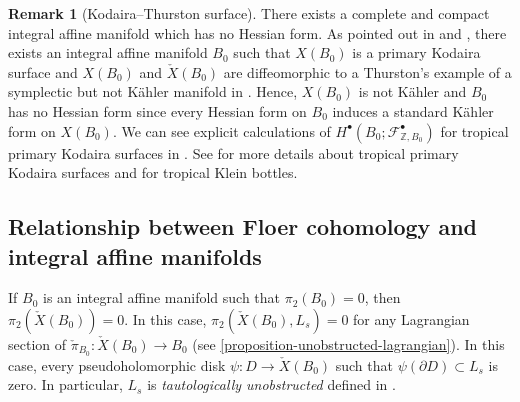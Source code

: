 \documentclass[a4paper,dvipdfmx,reqno,12pt]{amsart}
\theoremstyle{definition}
\newtheorem{remark}[theorem]{Remark}
\numberwithin{equation}{section}
\begin{document}
\begin{remark}[{Kodaira--Thurston surface}]
There exists a complete and compact integral affine manifold
  which has no Hessian form.
As pointed out in \cite[Example 1.14]{grossMirrorSymmetryLogarithmic2006a}
and \cite[p.403]{MR1461965}, there exists an integral affine manifold
$B_0$ such that
$X(B_0)$ is a primary Kodaira surface and $X(B_0)$
and $\check{X}(B_0)$
are diffeomorphic to a Thurston's example of a symplectic but
not K\"ahler manifold in \cite{MR402764}.
Hence, $X(B_0)$ is not K\"ahler and $B_0$ has no
Hessian form since every Hessian form on $B_0$ induces a 
standard K\"ahler form
on $X(B_0)$.
We can see explicit calculations of 
$H^{\bullet}(B_0;\mathcal{F}_{\mathbb{Z},B_0}^{\bullet})$
for tropical primary Kodaira surfaces in \cite{maehara2023}.
See \cite{MR1422337} for more details about tropical 
primary Kodaira surfaces and 
\cite{MR3079343,MR3894860} for tropical Klein bottles.

\end{remark}

\subsection{Relationship between Floer cohomology
and integral affine manifolds}


If $B_0$ is an integral affine manifold such 
that $\pi_2(B_0)=0$, then $\pi_2(\check{X}(B_0))=0$.
In this case, $\pi_2(\check{X}(B_0),L_s)=0$ for 
any Lagrangian section of 
$\check{\pi}_{B_0}\colon \check{X}(B_0)\to B_0$
(see \cref{proposition-unobstructed-lagrangian}).
In this case, every 
pseudoholomorphic disk 
$\psi\colon D\to \check{X}(B_0)$ such that 
$\psi(\partial D)\subset L_s$ is zero.
In particular, $L_s$ is 
\emph{tautologically unobstructed} defined in
\cite[(2.50)]{MR3656481}.
\end{document}

